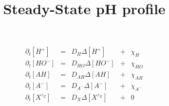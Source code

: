 \documentclass[aps,12pt]{revtex4}
\begin{document}
\title{Steady-State pH profile}
\maketitle


\begin{equation}
\begin{array}{rclcl}
	\partial_t [H^+]  & = & D_H \Delta [H^+]     &+&\chi_H\\
	\partial_t [HO^-] & = & D_{HO} \Delta [HO^-] &+&\chi_{HO}\\
	\partial_t [AH]   & = & D_{AH} \Delta [AH]   &+&\chi_{AH}\\
	\partial_t [A^-]  & = & D_{A^-} \Delta [A^-] &+& \chi_{A^-}\\
	\partial_t [X^{z_Z}] & = & D_X \Delta [X^{z_X}] &+& 0\\
\end{array}
\end{equation}
\end{document}
